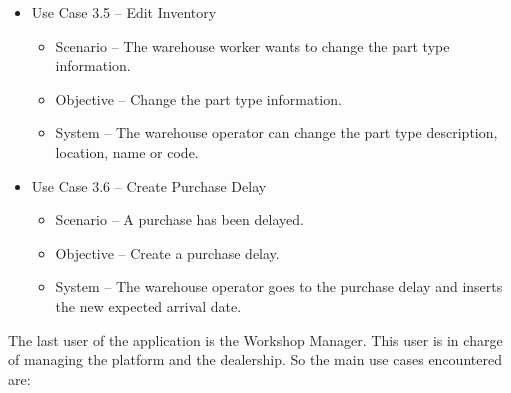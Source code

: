 \begin{itemize}
    \item Use Case 3.5 – Edit Inventory 
  \begin{itemize}
    \item Scenario – The warehouse worker wants to change the part type information.
    \item Objective – Change the part type information.
    \item System – The warehouse operator can change the part type description, location, name or code.
  \end{itemize}
  \item Use Case 3.6 – Create Purchase Delay
  \begin{itemize}
    \item Scenario – A purchase has been delayed.
    \item Objective – Create a purchase delay.
    \item System – The warehouse operator goes to the purchase delay and inserts the new expected arrival date.
  \end{itemize}
\end{itemize}
\hfill \break

The last user of the application is the Workshop Manager. This user is in charge of managing the platform and the dealership. So the main use cases encountered are:

